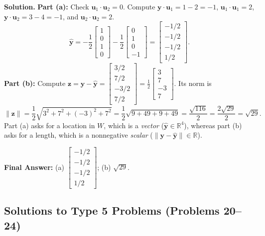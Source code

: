 \documentclass[11pt, letterpaper]{article}
\theoremstyle{definition}
\theoremstyle{remark}
\newcommand{\R}{\mathbb{R}}
\begin{document}
\textbf{Solution.}
\textbf{Part (a):} Check $\mathbf{u}_1 \cdot \mathbf{u}_2 = 0$. Compute $\mathbf{y} \cdot \mathbf{u}_1 = 1 - 2 = -1$, $\mathbf{u}_1 \cdot \mathbf{u}_1 = 2$, $\mathbf{y} \cdot \mathbf{u}_2 = 3 - 4 = -1$, and $\mathbf{u}_2 \cdot \mathbf{u}_2 = 2$.
\[
\hat{\mathbf{y}} = -\frac{1}{2}\begin{bmatrix} 1 \\ 0 \\ 1 \\ 0 \end{bmatrix} - \frac{1}{2}\begin{bmatrix} 0 \\ 1 \\ 0 \\ -1 \end{bmatrix} = \begin{bmatrix} -1/2 \\ -1/2 \\ -1/2 \\ 1/2 \end{bmatrix}.
\]
\textbf{Part (b):} Compute $\mathbf{z} = \mathbf{y} - \hat{\mathbf{y}} = \begin{bmatrix} 3/2 \\ 7/2 \\ -3/2 \\ 7/2 \end{bmatrix} = \frac{1}{2}\begin{bmatrix} 3 \\ 7 \\ -3 \\ 7 \end{bmatrix}$. Its norm is
\[
\|\mathbf{z}\| = \frac{1}{2}\sqrt{3^2 + 7^2 + (-3)^2 + 7^2} = \frac{1}{2}\sqrt{9 + 49 + 9 + 49} = \frac{\sqrt{116}}{2} = \frac{2\sqrt{29}}{2} = \sqrt{29}.
\]
Part (a) asks for a location in $W$, which is a \emph{vector} ($\hat{\mathbf{y}} \in \R^4$), whereas part (b) asks for a length, which is a nonnegative \emph{scalar} ($\|\mathbf{y} - \hat{\mathbf{y}}\| \in \R$).

\textbf{Final Answer:} (a) $\begin{bmatrix} -1/2 \\ -1/2 \\ -1/2 \\ 1/2 \end{bmatrix}$; (b) $\sqrt{29}$.

\subsection{Solutions to Type 5 Problems (Problems 20--24)}
\end{document}
